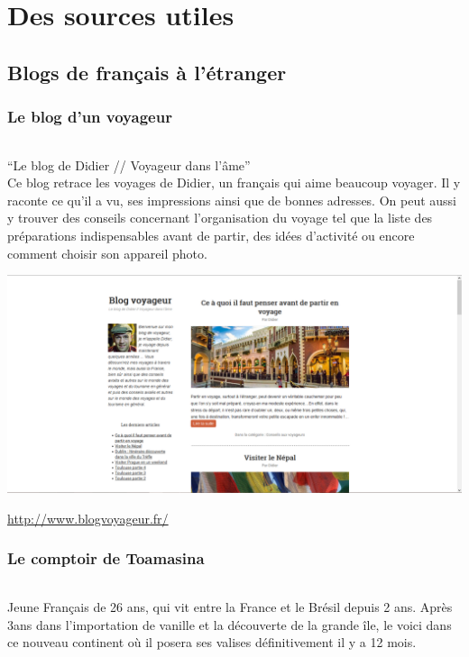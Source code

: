 \part{Des sources utiles}

\chapter[Français à l'étranger]{Blogs de français à l'étranger}

\section{Le blog d'un voyageur}

\paragraph{} ``Le blog de Didier // Voyageur dans l'âme'' \\
Ce blog retrace les voyages de Didier, un français qui aime beaucoup voyager.
Il y raconte ce qu'il a vu, ses impressions ainsi que de bonnes adresses. On
peut aussi y trouver des conseils concernant l'organisation du voyage tel que
la liste des préparations indispensables avant de partir, des idées d'activité
ou encore comment choisir son appareil photo.

\begin{center}
	\includegraphics[scale=0.25]{voyageur.png}
\end{center}
\url{http://www.blogvoyageur.fr/}

\section{Le comptoir de Toamasina}

\paragraph{} Jeune Français de 26 ans, qui vit entre la France et le Brésil
depuis 2 ans. Après 3ans dans l'importation de vanille et la découverte de la
grande île, le voici dans ce nouveau continent où il posera ses valises
définitivement il y a 12 mois.

